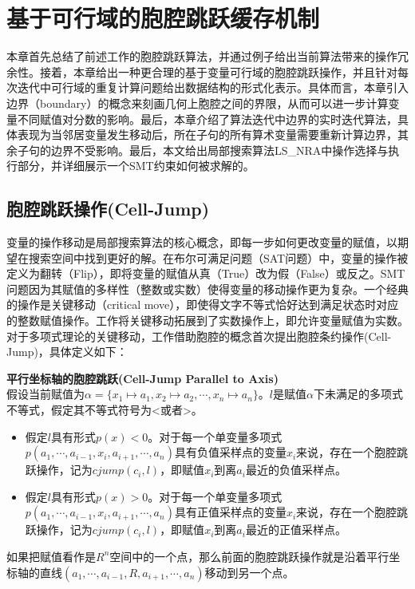 \chapter{基于可行域的胞腔跳跃缓存机制}\label{chap:method1}
本章首先总结了前述工作的胞腔跳跃算法，并通过例子给出当前算法带来的操作冗余性。接着，本章给出一种更合理的基于变量可行域的胞腔跳跃操作，并且针对每次迭代中可行域的重复计算问题给出数据结构的形式化表示。具体而言，本章引入边界（boundary）的概念来刻画几何上胞腔之间的界限，从而可以进一步计算变量不同赋值对分数的影响。最后，本章介绍了算法迭代中边界的实时迭代算法，具体表现为当邻居变量发生移动后，所在子句的所有算术变量需要重新计算边界，其余子句的边界不受影响。最后，本文给出局部搜索算法LS\_NRA中操作选择与执行部分，并详细展示一个SMT约束如何被求解的。

\section{胞腔跳跃操作(Cell-Jump)}
变量的操作移动是局部搜索算法的核心概念，即每一步如何更改变量的赋值，以期望在搜索空间中找到更好的解。在布尔可满足问题（SAT问题）中，变量的操作被定义为翻转（Flip），即将变量的赋值从真（True）改为假（False）或反之。SMT问题因为其赋值的多样性（整数或实数）使得变量的移动操作更为复杂。一个经典的操作是关键移动（critical move）\cite{CaiLZ22}，即使得文字不等式恰好达到满足状态时对应的整数赋值操作。工作\cite{multilinear}将关键移动拓展到了实数操作上，即允许变量赋值为实数。对于多项式理论的关键移动，工作\cite{LiXZ23}借助胞腔的概念首次提出胞腔条约操作(Cell-Jump)，具体定义如下：

\begin{definition}{\textbf{平行坐标轴的胞腔跳跃(Cell-Jump Parallel to Axis)}}\\
假设当前赋值为$\alpha = \{x_1 \mapsto a_1, x_2 \mapsto a_2, \cdots, x_n \mapsto a_n\}$。$l$是赋值$\alpha$下未满足的多项式不等式，假定其不等式符号为<或者>。
\begin{itemize}
    \item 假定$l$具有形式$p(x) < 0$。对于每一个单变量多项式$p(a_1, \cdots, a_{i-1}, x_i, a_{i+1}, \cdots, a_n)$具有负值采样点的变量$x_i$来说，存在一个胞腔跳跃操作，记为$cjump(c_i, l)$，即赋值$x_i$到离$a_i$最近的负值采样点。
    \item 假定$l$具有形式$p(x) > 0$。对于每一个单变量多项式$p(a_1, \cdots, a_{i-1}, x_i, a_{i+1}, \cdots, a_n)$具有正值采样点的变量$x_i$来说，存在一个胞腔跳跃操作，记为$cjump(c_i, l)$，即赋值$x_i$到离$a_i$最近的正值采样点。
\end{itemize}
如果把赋值看作是$R^n$空间中的一个点，那么前面的胞腔跳跃操作就是沿着平行坐标轴的直线$(a_1, \cdots, a_{i-1}, R, a_{i+1}, \cdots, a_n)$移动到另一个点。
\end{definition}

